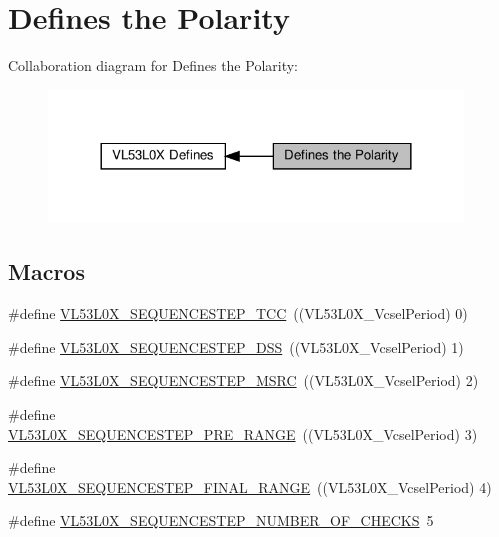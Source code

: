 \hypertarget{group__VL53L0X__define__SequenceStepId__group}{}\section{Defines the Polarity}
\label{group__VL53L0X__define__SequenceStepId__group}
Collaboration diagram for Defines the Polarity\+:\nopagebreak
\begin{figure}[H]
\begin{center}
\leavevmode
\includegraphics[width=312pt]{group__VL53L0X__define__SequenceStepId__group}
\end{center}
\end{figure}
\subsection*{Macros}
\begin{DoxyCompactItemize}
\item 
\#define \hyperlink{group__VL53L0X__define__SequenceStepId__group_gaf4a4c4ee04b303f4f08f2d1f4fae9811}{V\+L53\+L0\+X\+\_\+\+S\+E\+Q\+U\+E\+N\+C\+E\+S\+T\+E\+P\+\_\+\+T\+CC}~((V\+L53\+L0\+X\+\_\+\+Vcsel\+Period) 0)
\item 
\#define \hyperlink{group__VL53L0X__define__SequenceStepId__group_ga86ce83e9efbd7afbf1f95f1f2988e35b}{V\+L53\+L0\+X\+\_\+\+S\+E\+Q\+U\+E\+N\+C\+E\+S\+T\+E\+P\+\_\+\+D\+SS}~((V\+L53\+L0\+X\+\_\+\+Vcsel\+Period) 1)
\item 
\#define \hyperlink{group__VL53L0X__define__SequenceStepId__group_gab8dded683178089ec7a0cc4db1bf8655}{V\+L53\+L0\+X\+\_\+\+S\+E\+Q\+U\+E\+N\+C\+E\+S\+T\+E\+P\+\_\+\+M\+S\+RC}~((V\+L53\+L0\+X\+\_\+\+Vcsel\+Period) 2)
\item 
\#define \hyperlink{group__VL53L0X__define__SequenceStepId__group_gacb25b6b997a4baed47fbd5a5d6cc8214}{V\+L53\+L0\+X\+\_\+\+S\+E\+Q\+U\+E\+N\+C\+E\+S\+T\+E\+P\+\_\+\+P\+R\+E\+\_\+\+R\+A\+N\+GE}~((V\+L53\+L0\+X\+\_\+\+Vcsel\+Period) 3)
\item 
\#define \hyperlink{group__VL53L0X__define__SequenceStepId__group_ga54b2e024f4299dbd2b53128b82c5fcd0}{V\+L53\+L0\+X\+\_\+\+S\+E\+Q\+U\+E\+N\+C\+E\+S\+T\+E\+P\+\_\+\+F\+I\+N\+A\+L\+\_\+\+R\+A\+N\+GE}~((V\+L53\+L0\+X\+\_\+\+Vcsel\+Period) 4)
\item 
\#define \hyperlink{group__VL53L0X__define__SequenceStepId__group_ga407e1ebc2c5ab160f4e1f3c58e1a6b7f}{V\+L53\+L0\+X\+\_\+\+S\+E\+Q\+U\+E\+N\+C\+E\+S\+T\+E\+P\+\_\+\+N\+U\+M\+B\+E\+R\+\_\+\+O\+F\+\_\+\+C\+H\+E\+C\+KS}~5
\end{DoxyCompactItemize}
